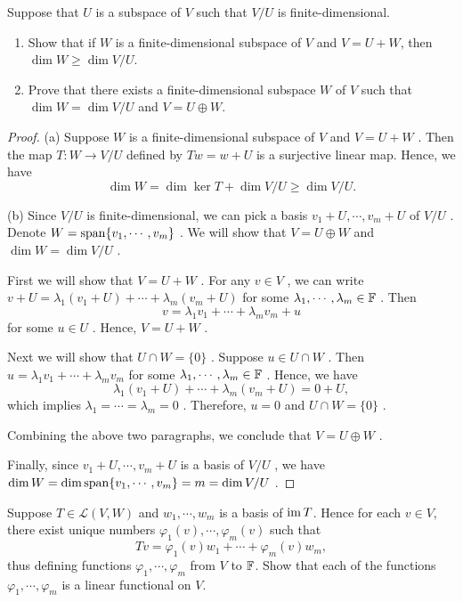 \documentclass{article}
\begin{document}
\begin{problem}[3E-18]
	Suppose that $U$ is a subspace of $V$ such that $V/U$ is finite-dimensional.
	\begin{enumerate}[label=(\alph*)]
		\item Show that if $W$ is a finite-dimensional subspace of $V$ and $V = U + W$, then $\dim W \geq \dim V/U$.
		\item Prove that there exists a finite-dimensional subspace $W$ of $V$ such that $\dim W = \dim V/U$ and $V = U \oplus W$.
	\end{enumerate}
\end{problem}

\begin{proof}
	(a)  Suppose \( W \) is a finite-dimensional subspace of \( V \) and \( V = U + W \) . Then the map \( T:W\to V/U \) defined by \( Tw=w+U \) is a surjective linear map. Hence, we have
	\[ \dim W=\dim\ker T+\dim V/U\geq \dim V/U. \] \par
	(b)  Since \( V/U \) is finite-dimensional, we can pick a basis \( v_1+U, \cdots, v_m+U \) of \( V/U \) . Denote \( W=\operatorname{span}\{v_1,\cdots,v_m\} \) . We will show that \( V=U\oplus W \) and \( \dim W=\dim V/U \) .\par
	First we will show that \( V=U+W \) . For any \( v\in V \) , we can write \( v+U=\lambda_1(v_1+U)+\cdots+\lambda_m(v_m+U) \) for some \( \lambda_1,\cdots,\lambda_m\in\mathbb{F} \) . Then
	\[ v=\lambda_1v_1+\cdots+\lambda_mv_m+u \] for some \( u\in U \) . Hence, \( V=U+W \) .\par
	Next we will show that \( U\cap W=\{0\} \) . Suppose \( u\in U\cap W \) . Then \( u=\lambda_1v_1+\cdots+\lambda_mv_m \) for some \( \lambda_1,\cdots,\lambda_m\in\mathbb{F} \) . Hence, we have
	\[ \lambda_1(v_1+U)+\cdots+\lambda_m(v_m+U)=0+U, \] which implies \( \lambda_1=\cdots=\lambda_m=0 \) . Therefore, \( u=0 \) and \( U\cap W=\{0\} \) .\par
	Combining the above two paragraphs, we conclude that \( V=U\oplus W \) .\par
	Finally, since \( v_1+U, \cdots, v_m+U \) is a basis of \( V/U \) , we have \( \dim W=\dim\operatorname{span}\{v_1,\cdots,v_m\}=m=\dim V/U \) .
\end{proof}

\begin{problem}[3F-5]
	Suppose $T \in \mathcal{L}(V, W)$ and $w_1, \cdots, w_m$ is a basis of $\operatorname{im} T$. Hence for each $v \in V$, there exist unique numbers $\varphi_1(v), \cdots, \varphi_m(v)$ such that
	\[
		Tv = \varphi_1(v)w_1 + \cdots + \varphi_m(v)w_m,
	\]
	thus defining functions $\varphi_1, \cdots, \varphi_m$ from $V$ to $\mathbb{F}$. Show that each of the functions $\varphi_1, \cdots, \varphi_m$ is a linear functional on $V$.
\end{problem}
\end{document}

